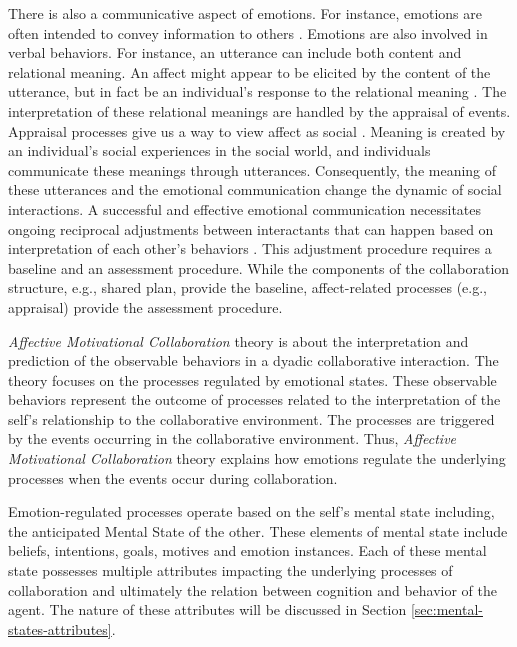 \documentclass[12pt]{report}
\begin{document}
There is also a communicative aspect of emotions. For instance, emotions are
often intended to convey information to others \cite{goffman:self-presentation}.
Emotions are also involved in verbal behaviors. For instance, an utterance can
include both content and relational meaning. An affect might appear to be
elicited by the content of the utterance, but in fact be an individual's
response to the relational meaning \cite{planalp:communicating-emotion}. The
interpretation of these relational meanings are handled by the appraisal of
events. Appraisal processes give us a way to view affect as social
\cite{hooft:sharing-emotions}. Meaning is created by an individual's social
experiences in the social world, and individuals communicate these meanings
through utterances. Consequently, the meaning of these utterances and the
emotional communication change the dynamic of social interactions. A successful
and effective emotional communication necessitates ongoing reciprocal
adjustments between interactants that can happen based on interpretation of each
other's behaviors \cite{parkinson:emotion-social-interaction}. This adjustment
procedure requires a baseline and an assessment procedure. While the components
of the collaboration structure, e.g., shared plan, provide the baseline,
affect-related processes (e.g., appraisal) provide the assessment procedure.

\textit{Affective Motivational Collaboration} theory is about the interpretation
and prediction of the observable behaviors in a dyadic collaborative
interaction. The theory focuses on the processes regulated by emotional states.
These observable behaviors represent the outcome of processes related to the
interpretation of the self's relationship to the collaborative environment.
The processes are triggered by the events occurring in the collaborative
environment. Thus, \textit{Affective Motivational Collaboration} theory explains
how emotions regulate the underlying processes when the events occur during
collaboration.

Emotion-regulated processes operate based on the self's mental state including,
the anticipated Mental State of the other. These elements of mental state
include beliefs, intentions, goals, motives and emotion instances. Each of these
mental state possesses multiple attributes impacting the underlying processes of
collaboration and ultimately the relation between cognition and behavior of the
agent. The nature of these attributes will be discussed in Section
\ref{sec:mental-states-attributes}.
\end{document}
